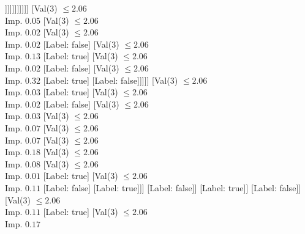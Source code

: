 \documentclass[margin=10pt]{standalone}
\begin{document}
\begin{forest}
																[Label: false]
																[Val($3$) $ \leq 2.05$ \\ Imp. $0.04$
																	[Label: true]
																	[Val($3$) $ \leq 2.05$ \\ Imp. $0.18$
																		[Label: false]
																		[Val($3$) $ \leq 2.05$ \\ Imp. $0.12$
																			[Label: true]
																			[Val($3$) $ \leq 2.05$ \\ Imp. $0.50$
																				[Label: false]
																				[Label: true]]]]]]]]]]]
										[Val($3$) $ \leq 2.06$ \\ Imp. $0.05$
											[Val($3$) $ \leq 2.06$ \\ Imp. $0.02$
												[Val($3$) $ \leq 2.06$ \\ Imp. $0.02$
													[Label: false]
													[Val($3$) $ \leq 2.06$ \\ Imp. $0.13$
														[Label: true]
														[Val($3$) $ \leq 2.06$ \\ Imp. $0.02$
															[Label: false]
															[Val($3$) $ \leq 2.06$ \\ Imp. $0.32$
																[Label: true]
																[Label: false]]]]]
												[Val($3$) $ \leq 2.06$ \\ Imp. $0.03$
													[Label: true]
													[Val($3$) $ \leq 2.06$ \\ Imp. $0.02$
														[Label: false]
														[Val($3$) $ \leq 2.06$ \\ Imp. $0.03$
															[Val($3$) $ \leq 2.06$ \\ Imp. $0.07$
																[Val($3$) $ \leq 2.06$ \\ Imp. $0.07$
																	[Val($3$) $ \leq 2.06$ \\ Imp. $0.18$
																		[Val($3$) $ \leq 2.06$ \\ Imp. $0.08$
																			[Val($3$) $ \leq 2.06$ \\ Imp. $0.01$
																				[Label: true]
																				[Val($3$) $ \leq 2.06$ \\ Imp. $0.11$
																					[Label: false]
																					[Label: true]]]
																			[Label: false]]
																		[Label: true]]
																	[Label: false]]
																[Val($3$) $ \leq 2.06$ \\ Imp. $0.11$
																	[Label: true]
																	[Val($3$) $ \leq 2.06$ \\ Imp. $0.17$

\end{forest}
\end{document}
